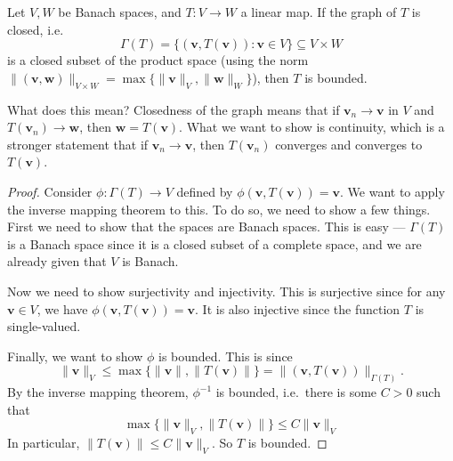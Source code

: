\documentclass[a4paper]{article}
\begin{document}
\begin{thm}
  Let $V, W$ be Banach spaces, and $T: V\to W$ a linear map. If the graph of $T$ is closed, i.e.
  \[
    \Gamma(T) = \{(\mathbf{v}, T(\mathbf{v})): \mathbf{v}\in V\} \subseteq V\times W
  \]
  is a closed subset of the product space (using the norm $\|(\mathbf{v}, \mathbf{w})\|_{V\times W} = \max \{\|\mathbf{v}\|_V, \|\mathbf{w}\|_W\}$), then $T$ is bounded.
\end{thm}
What does this mean? Closedness of the graph means that if $\mathbf{v}_n \to \mathbf{v}$ in $V$ and $T (\mathbf{v}_n) \to \mathbf{w}$, then $\mathbf{w} = T(\mathbf{v})$. What we want to show is continuity, which is a stronger statement that if $\mathbf{v}_n \to \mathbf{v}$, then $T(\mathbf{v}_n)$ converges and converges to $T(\mathbf{v})$.

\begin{proof}
  Consider $\phi: \Gamma(T) \to V$ defined by $\phi(\mathbf{v}, T(\mathbf{v})) = \mathbf{v}$. We want to apply the inverse mapping theorem to this. To do so, we need to show a few things. First we need to show that the spaces are Banach spaces. This is easy --- $\Gamma(T)$ is a Banach space since it is a closed subset of a complete space, and we are already given that $V$ is Banach.

  Now we need to show surjectivity and injectivity. This is surjective since for any $\mathbf{v}\in V$, we have $\phi(\mathbf{v}, T(\mathbf{v})) = \mathbf{v}$. It is also injective since the function $T$ is single-valued.

  Finally, we want to show $\phi$ is bounded. This is since
  \[
    \|\mathbf{v}\|_V \leq \max\{\|\mathbf{v}\|, \|T(\mathbf{v})\|\} = \|(\mathbf{v}, T(\mathbf{v}))\|_{\Gamma(T)}.
  \]
  By the inverse mapping theorem, $\phi^{-1}$ is bounded, i.e.\ there is some $C > 0$ such that
  \[
    \max\{\|\mathbf{v}\|_V, \|T(\mathbf{v})\|\} \leq C\|\mathbf{v}\|_V
  \]
  In particular, $\|T(\mathbf{v})\| \leq C\|\mathbf{v}\|_V$. So $T$ is bounded.
\end{proof}
\end{document}
